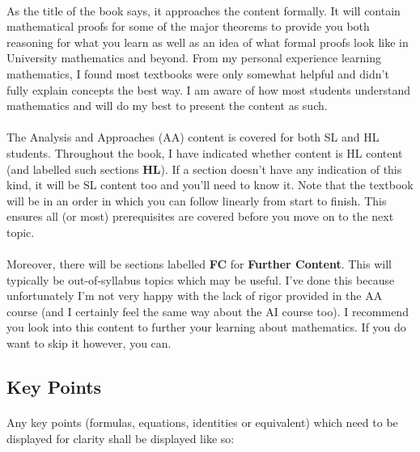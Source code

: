 \documentclass[12pt, a4paper, titlepage, twoside]{article}
\begin{document}
	\paragraph{}
	As the title of the book says, it approaches the content formally. It will contain mathematical proofs for some of the 
	major theorems to provide you both reasoning for what you learn as well as an idea of what formal proofs look like in University 
	mathematics and beyond. From my personal experience learning mathematics, I found most textbooks were only somewhat helpful and 
	didn't fully explain concepts the best way. I am aware of how most students understand mathematics and will do my best to present the 
	content as such. 

	\paragraph{}
	The Analysis and Approaches (AA) content is covered for both SL and HL students. Throughout the book,
	I have indicated whether content is HL content (and labelled such sections \textbf{HL}). If a section doesn't have
	any indication of this kind, it will be SL content too and you'll need to know it. 
	Note that the textbook will be in an order in which you can follow linearly from start to finish. This ensures all (or most) prerequisites are 
	covered before you move on to the next topic.
	
	\paragraph{}
	Moreover, there will be sections labelled \textbf{FC} for \textbf{Further Content}. This will typically be out-of-syllabus topics which may
	be useful. I've done this because unfortunately I'm not very happy with the lack of rigor provided in the AA course (and I certainly feel the 
	same way about the AI course too). I recommend you look into this content to further your learning about mathematics. If you do want to
	skip it however, you can.

	\subsection*{Key Points}
	
	\paragraph{}
	Any key points (formulas, equations, identities or equivalent) which need to be displayed for clarity shall be displayed like so:\\
	
\end{document}
